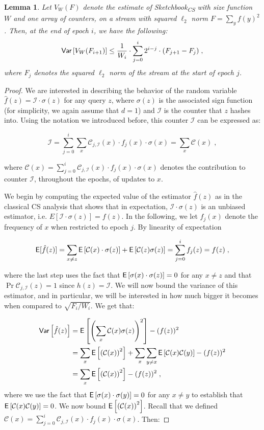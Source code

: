 \documentclass[sigconf]{acmart}
\newtheorem{lemma}[theorem]{Lemma}
\newcommand{\sketch}{Sketchbook}
\newcommand{\sketchcs}{\sketch\textsubscript{CS}\xspace}
\begin{document}
\begin{lemma}\label{lemma:cs-w}
Let $V_W(F)$  denote the estimate of \sketchcs  with size function $W$ and one array of counters, on a stream with squared $\ell_2$ norm $F = \sum_y f(y)^2$. Then, at the end of epoch $i$, we have the following:
	$$\textsf{Var}\left[ V_W(F_{i+1}) \right] \leq  \frac{1}{W_i} \cdot 	\sum_{j=0}^i  2^{i-j} \cdot  (F_{j+1} - F_j) \;,$$
	where $F_j$ denotes the squared  $\ell_2$ norm of the stream at the start of epoch $j$. 
\end{lemma}
\begin{proof}
We are interested in describing the behavior of the random variable $\hat{f}(z) = \mathcal{I} \cdot \sigma(z)$ for any query $z$, where $\sigma(z)$ is the associated sign function (for simplicity, we again assume that $d=1$) and $\mathcal{I}$ is the counter that $z$ hashes into. Using the notation we introduced before, this counter $\mathcal{I}$ can be expressed as:

$$ \mathcal{I} =\sum_{j=0}^i   \sum_x \mathcal{C}_{j,\mathcal{I}}(x) \cdot f_j(x) \cdot \sigma(x)  = \sum_x \mathcal{C}(x)  \;,$$

where  $\mathcal{C}(x) =  \sum_{j=0}^i   \mathcal{C}_{j,\mathcal{I}}(x) \cdot f_j(x) \cdot \sigma(x)$ denotes the contribution to counter $\mathcal{I}$, throughout the epochs, of updates to $x$.

We begin by computing the expected value of the estimator $\hat{f}(z)$ as in the classical CS analysis that shows that in expectation, $\mathcal{I} \cdot \sigma(z)$ is an unbiased estimator, i.e. $E[\mathcal{I} \cdot \sigma(z)] = f(z)$. In the following, we let $f_j(x)$ denote the frequency of $x$ when restricted to epoch $j$. By linearity of expectation

$$	\textsf{E}[\hat{f}(z)] =  \sum_{x \neq z}\mathsf{E}\left[ \mathcal{C}(x) \cdot \sigma(z)  \right] + \mathsf{E}\left[ \mathcal{C}(z)\sigma(z) \right] = \sum_{j=0}^i f_j(z) = f(z)\;,$$

where the last step uses the fact that $\mathsf{E}\left[ \sigma(x) \cdot \sigma(z)  \right] =0$ for any $x \neq z$ and that $\Pr{ \mathcal{C}_{j,\mathcal{I}}(z)}=1$ since $h(z)=\mathcal{I}$. We will now bound the variance of this estimator, and in particular, we will be interested in how much bigger it becomes when compared to $\sqrt{F_i/W_i}$.  We get that:

\begin{align*}
\textsf{Var}\left[ \hat{f}(z) \right] &= \mathsf{E}\left[ \left(\sum_x \mathcal{C}(x) \sigma(z)\right)^2 \right]  - (f(z))^2 \\
& = \sum_x \mathsf{E}\left[ \left(\mathcal{C}(x)\right)^2 \right] + \sum_x \sum_{y \neq x}\mathsf{E}\left[  \mathcal{C}(x) \mathcal{C}(y) \right] -  (f(z))^2 \\
&=\sum_x \mathsf{E}\left[ \left(\mathcal{C}(x)\right)^2 \right] - (f(z))^2 \;,
\end{align*}
where we  use the fact that $\mathsf{E}\left[ \sigma(x) \cdot \sigma(y)  \right] =0$  for any $x\neq y$ to establish that $\mathsf{E}\left[  \mathcal{C}(x) \mathcal{C}(y) \right]=0$. We now bound $\mathsf{E}\left[ \left(\mathcal{C}(x)\right)^2 \right]$. Recall that we defined $\mathcal{C}(x) =  \sum_{j=0}^i   \mathcal{C}_{j,\mathcal{I}}(x) \cdot f_j(x) \cdot \sigma(x)$. Then:


\end{proof}
\end{document}

